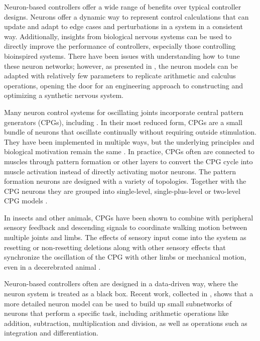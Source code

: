 
Neuron-based controllers offer a wide range of benefits over typical controller
designs. Neurons offer a dynamic way to represent control calculations that can
update and adapt to edge cases and perturbations in a system in a consistent 
way. Additionally, insights from biological nervous systems can be used to 
directly improve the performance of controllers, especially those controlling 
bioinspired systems. There have been issues with understanding how
to tune these neuron networks; however, as presented in 
\cite{NickFunctionalSubnetwork}, the neuron models can be adapted with 
relatively few parameters to replicate arithmetic and calculus operations, 
opening the door for an engineering approach to constructing and optimizing a synthetic nervous system.


Many neuron control systems for oscillating joints incorporate central pattern
generators (CPGs), including 
\cite{Narioka2012, EventBasedWalking, HuntHindLegWalking, HuntPhDThesis}.
In their most reduced form, CPGs are a small bundle of
neurons that oscillate continually without requiring outside stimulation. They
have been implemented in multiple ways, but the underlying principles and 
biological motivation remain the same \cite{CPGReview}.
In
practice, CPGs often are connected to muscles through pattern formation or other
layers to convert the CPG cycle into muscle activation instead of directly
activating motor neurons. The pattern formation neurons are designed with a variety of topologies. Together with the CPG neurons they are grouped into single-level,
single-plus-level or two-level CPG models \cite{MultiLevelCPG}.

In insects and other animals, CPGs have been shown to combine with peripheral 
sensory feedback and
descending signals to coordinate walking motion between multiple joints and
limbs. The effects of sensory input come into the system as resetting or non-resetting deletions
along with other sensory effects that synchronize the oscillation of the CPG
with other limbs or mechanical motion, even in a decerebrated animal
\cite{SixLeggedWalking, CPGReview}.



Neuron-based controllers often are designed in a data-driven way, where the
neuron system is treated as a black box. Recent work, collected in 
\cite{NickFunctionalSubnetwork}, shows that a more detailed neuron model can be
used to build up small subnetworks of neurons that perform a specific task,
including arithmetic operations like addition, subtraction, multiplication and
division, as well as operations such as integration and differentiation.


